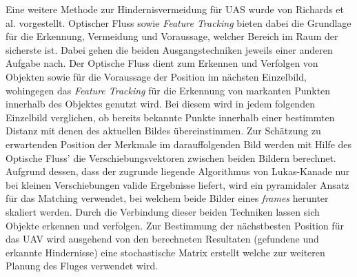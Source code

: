 \noindent
Eine weitere Methode zur Hindernisvermeidung für UAS wurde von Richards et al. \cite{richards2014obstacle} vorgestellt. Optischer Fluss sowie \emph{Feature Tracking} bieten dabei die Grundlage für die Erkennung, Vermeidung und Voraussage, welcher Bereich im Raum der sicherste ist. Dabei gehen die beiden Ausgangstechniken jeweils einer anderen Aufgabe nach. Der Optische Fluss dient zum Erkennen und Verfolgen von Objekten sowie für die Voraussage der Position im nächsten Einzelbild, wohingegen das \emph{Feature Tracking} \cite{shi1994good} für die Erkennung von markanten Punkten innerhalb des Objektes genutzt wird. Bei diesem wird in jedem folgenden Einzelbild verglichen, ob bereits bekannte Punkte innerhalb einer bestimmten Distanz mit denen des aktuellen Bildes übereinstimmen. Zur Schätzung zu erwartenden Position der Merkmale im darauffolgenden Bild werden mit Hilfe des Optische Fluss’ die Verschiebungsvektoren zwischen beiden Bildern berechnet. Aufgrund dessen, dass der zugrunde liegende Algorithmus von Lukas-Kanade \cite{lucas1981iterative} nur bei kleinen Verschiebungen valide Ergebnisse liefert, wird ein pyramidaler Ansatz \cite{bouguet2001pyramidal} für das Matching verwendet, bei welchem beide Bilder eines \emph{frames} herunter skaliert werden. Durch die Verbindung dieser beiden Techniken lassen sich Objekte erkennen und verfolgen. Zur Bestimmung der nächstbesten Position für das UAV wird ausgehend von den berechneten Resultaten (gefundene und erkannte Hindernisse) eine stochastische Matrix erstellt welche zur weiteren Planung des Fluges verwendet wird.\\

